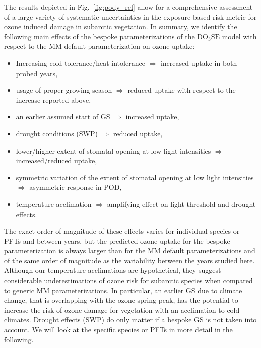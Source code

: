 \documentclass[bg, manuscript]{copernicus}
\begin{document}
The results depicted in Fig.~\ref{fig:pody_rel} allow for a comprehensive assessment of a large variety of systematic uncertainties in the exposure-based risk metric for ozone induced damage in subarctic vegetation. In summary, we identify the following main effects of the bespoke parameterizations of the $\mathrm{DO_3SE}$ model with respect to the MM default parameterization on ozone uptake:
\begin{itemize}
  \itemsep0pt
\item Increasing cold tolerance/heat intolerance $\Rightarrow$ increased uptake in both probed years,
\item usage of proper growing season $\Rightarrow$ reduced uptake with respect to the increase reported above,
\item an earlier assumed start of GS $\Rightarrow$ increased uptake,
\item drought conditions (SWP) $\Rightarrow$ reduced uptake,
\item lower/higher extent of stomatal opening at low light intensities $\Rightarrow$ increased/reduced uptake,
\item symmetric variation of the extent of stomatal opening at low light intensities $\Rightarrow$ asymmetric response in POD,
\item temperature acclimation $\Rightarrow$ amplifying effect on light threshold and drought effects.
\end{itemize}
The exact order of magnitude of these effects varies for individual species or PFTs and between years, but the predicted ozone uptake for the bespoke parameterization is always larger than for the MM default parameterizations and of the same order of magnitude as the variability between the years studied here. Although our temperature acclimations are hypothetical, they suggest considerable underestimations of ozone risk for subarctic species when compared to generic MM parameterizations. In particular, an earlier GS due to climate change, that is overlapping with the ozone spring peak, has the potential to increase the risk of ozone damage for vegetation with an acclimation to cold climates. Drought effects (SWP) do only matter if a bespoke GS is not taken into account. We will look at the specific species or PFTs in more detail in the following.
\end{document}
